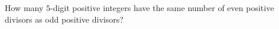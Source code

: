 How many $5$-digit positive integers have the same number of even positive divisors as odd positive divisors?
